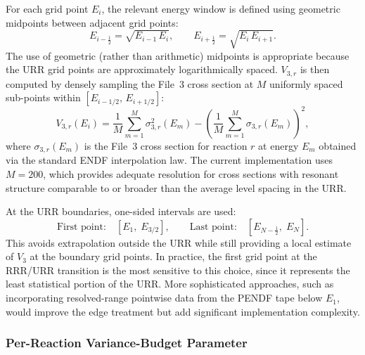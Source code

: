 \documentclass{style/nseJournal}
\begin{document}
For each grid point $E_i$, the relevant energy window is defined using geometric midpoints between adjacent grid points:
\begin{equation}
E_{i-\frac{1}{2}} = \sqrt{E_{i-1}\,E_i}, \qquad E_{i+\frac{1}{2}} = \sqrt{E_i\,E_{i+1}}.
\label{eq:half-interval}
\end{equation}
The use of geometric (rather than arithmetic) midpoints is appropriate because the URR grid points are approximately logarithmically spaced. $V_{3,r}$ is then computed by densely sampling the File~3 cross section at $M$ uniformly spaced sub-points within $[E_{i-1/2},\,E_{i+1/2}]$:
\begin{equation}
V_{3,r}(E_i) = \frac{1}{M}\sum_{m=1}^{M}\sigma_{3,r}^2(E_m) - \left(\frac{1}{M}\sum_{m=1}^{M}\sigma_{3,r}(E_m)\right)^2,
\label{eq:v3-computation}
\end{equation}
where $\sigma_{3,r}(E_m)$ is the File~3 cross section for reaction $r$ at energy $E_m$ obtained via the standard ENDF interpolation law. The current implementation uses $M=200$, which provides adequate resolution for cross sections with resonant structure comparable to or broader than the average level spacing in the URR.

At the URR boundaries, one-sided intervals are used:
\begin{equation}
\text{First point:}\quad [E_1,\; E_{3/2}], \qquad \text{Last point:}\quad [E_{N-\frac{1}{2}},\; E_N].
\end{equation}
This avoids extrapolation outside the URR while still providing a local estimate of $V_3$ at the boundary grid points. In practice, the first grid point at the RRR/URR transition is the most sensitive to this choice, since it represents the least statistical portion of the URR. More sophisticated approaches, such as incorporating resolved-range pointwise data from the PENDF tape below $E_1$, would improve the edge treatment but add significant implementation complexity.

\subsubsection{Per-Reaction Variance-Budget Parameter}
\label{sssec:per-reaction-a}
\end{document}
